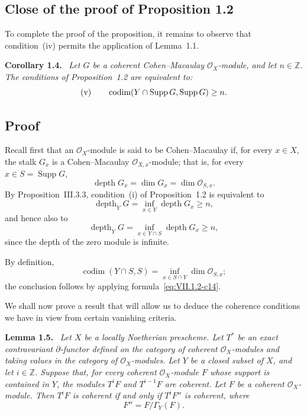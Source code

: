 \documentclass[11pt,a4paper]{article}
\newcommand{\OX}{\mathcal O_X}
\newcommand{\Oo}{\mathcal O}
\newcommand{\Supp}{\operatorname{Supp}}
\newcommand{\codimop}{\operatorname{codim}}
\newcommand{\depthop}{\operatorname{depth}}
\newenvironment{sgastatement}[1]{\par\addvspace{0.8\baselineskip}\noindent\textbf{#1.}\ \itshape}{\par}
\begin{document}
\subsection*{Close of the proof of Proposition 1.2}
To complete the proof of the proposition, it remains to observe that
condition~(iv) permits the application of Lemma~1.1.

\begin{sgastatement}{Corollary 1.4}
Let $G$ be a coherent Cohen--Macaulay $\OX$-module, and let $n\in\mathbb Z$.
The conditions of Proposition~1.2 are equivalent to:
\[
  \textup{(v)}\qquad
  \codimop(Y\cap\Supp G,\Supp G)\geq n.
\]
\end{sgastatement}

\subsection*{Proof}
Recall first that an $\OX$-module is said to be Cohen--Macaulay if, for every
$x\in X$, the stalk $G_x$ is a Cohen--Macaulay $\Oo_{X,x}$-module; that is,
for every $x\in S=\Supp G$,
\begin{equation}
  \depthop G_x=\dim G_x=\dim\Oo_{S,x}.
  \tag{1.2}\label{eq:VII.1.2-c14}
\end{equation}
By Proposition~III.3.3, condition~(i) of Proposition~1.2 is equivalent to
\begin{equation}
  \depthop_Y G=\inf_{x\in Y}\depthop G_x\geq n,
  \tag{1.3}\label{eq:VII.1.3-c14}
\end{equation}
and hence also to
\[
  \depthop_Y G=\inf_{x\in Y\cap S}\depthop G_x\geq n,
\]
since the depth of the zero module is infinite.

By definition,
\[
  \codimop(Y\cap S,S)=\inf_{x\in S\cap Y}\dim\Oo_{S,x};
\]
the conclusion follows by applying formula~\eqref{eq:VII.1.2-c14}.

We shall now prove a result that will allow us to deduce the coherence
conditions we have in view from certain vanishing criteria.

\begin{sgastatement}{Lemma 1.5}
Let $X$ be a locally Noetherian prescheme. Let $T^{\ast}$ be an exact
contravariant $\partial$-functor defined on the category of coherent
$\OX$-modules and taking values in the category of $\OX$-modules. Let $Y$ be a
closed subset of $X$, and let $i\in\mathbb Z$. Suppose that, for every coherent
$\OX$-module $F$ whose support is contained in $Y$, the modules $T^iF$ and
$T^{i-1}F$ are coherent. Let $F$ be a coherent $\OX$-module. Then $T^iF$ is
coherent if and only if $T^iF''$ is coherent, where
\[
  F''=F/\Gamma_Y(F).
\]
\end{sgastatement}
\end{document}

